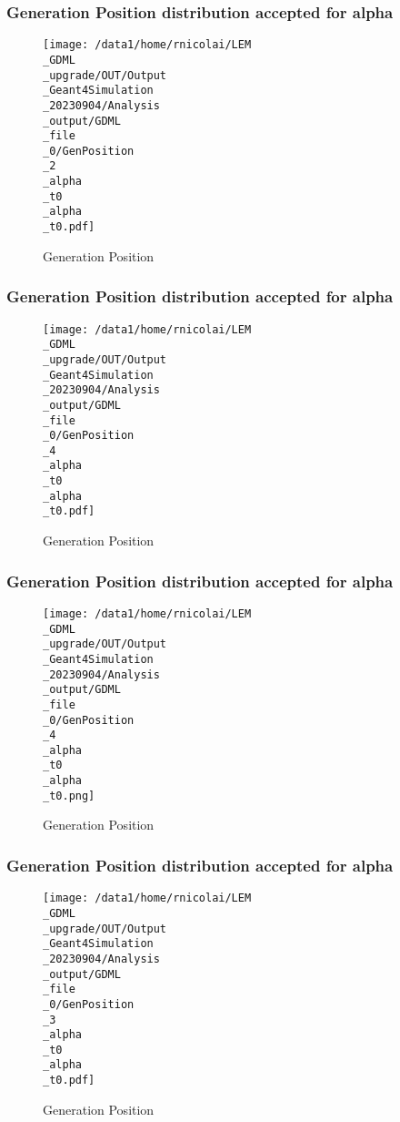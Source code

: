 \documentclass[8pt]{beamer}
\begin{document}
            \begin{frame}
                \frametitle{Generation Position distribution accepted for alpha}
            
        \begin{figure}[h]
            \centering
            \texttt{[image: /data1/home/rnicolai/LEM\\\_GDML\\\_upgrade/OUT/Output\\\_Geant4Simulation\\\_20230904/Analysis\\\_output/GDML\\\_file\\\_0/GenPosition\\\_2\\\_alpha\\\_t0\\\_alpha\\\_t0.pdf]}
            \caption{Generation Position}
        \end{figure}
        
            \end{frame}
            
            \begin{frame}
                \frametitle{Generation Position distribution accepted for alpha}
            
        \begin{figure}[h]
            \centering
            \texttt{[image: /data1/home/rnicolai/LEM\\\_GDML\\\_upgrade/OUT/Output\\\_Geant4Simulation\\\_20230904/Analysis\\\_output/GDML\\\_file\\\_0/GenPosition\\\_4\\\_alpha\\\_t0\\\_alpha\\\_t0.pdf]}
            \caption{Generation Position}
        \end{figure}
        
            \end{frame}
            
            \begin{frame}
                \frametitle{Generation Position distribution accepted for alpha}
            
        \begin{figure}[h]
            \centering
            \texttt{[image: /data1/home/rnicolai/LEM\\\_GDML\\\_upgrade/OUT/Output\\\_Geant4Simulation\\\_20230904/Analysis\\\_output/GDML\\\_file\\\_0/GenPosition\\\_4\\\_alpha\\\_t0\\\_alpha\\\_t0.png]}
            \caption{Generation Position}
        \end{figure}
        
            \end{frame}
            
            \begin{frame}
                \frametitle{Generation Position distribution accepted for alpha}
            
        \begin{figure}[h]
            \centering
            \texttt{[image: /data1/home/rnicolai/LEM\\\_GDML\\\_upgrade/OUT/Output\\\_Geant4Simulation\\\_20230904/Analysis\\\_output/GDML\\\_file\\\_0/GenPosition\\\_3\\\_alpha\\\_t0\\\_alpha\\\_t0.pdf]}
            \caption{Generation Position}
        \end{figure}
        
            \end{frame}
            
\end{document}
